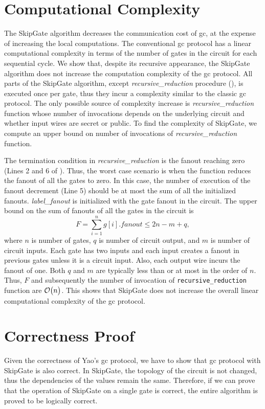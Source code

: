 \section{Computational Complexity}\label{sec:skipgate-complex}
The SkipGate algorithm decreases the communication cost of \acrshort{gc}, at the expense of increasing the local computations.
The conventional \acrshort{gc} protocol has a linear computational complexity in terms of the number of gates in the circuit for each sequential cycle.
We show that, despite its recursive appearance, the SkipGate algorithm does not increase the computation complexity of the \acrshort{gc} protocol.
All parts of the SkipGate algorithm, except \textit{recursive\_reduction} procedure (), is executed once per gate, thus they incur a complexity similar to the classic \acrshort{gc} protocol.
The only possible source of complexity increase is \textit{recursive\_reduction} function whose number of invocations depends on the underlying circuit and whether input wires are secret or public.
To find the complexity of SkipGate, we compute an upper bound on number of invocations of \textit{recursive\_reduction} function.

The termination condition in \textit{recursive\_reduction} is the fanout reaching zero (Lines 2 and 6 of ).
Thus, the worst case scenario is when the function reduces the fanout of all the gates to zero.
In this case, the number of execution of the fanout decrement (Line 5) should be at most the sum of all the initialized fanouts.
\textit{label\_fanout} is initialized with the gate fanout in the circuit.
The upper bound on the sum of fanouts of all the gates in the circuit is $$F = \sum_{i=1}^{n} g[i].fanout \le 2n - m + q,$$ where $n$ is number of gates, $q$ is number of circuit output, and $m$ is number of circuit inputs.
Each gate has two inputs and each input creates a fanout in previous gates unless it is a circuit input.
Also, each output wire incurs the fanout of one.
Both $q$ and $m$ are typically less than or at most in the order of $n$.
Thus, $F$ and subsequently the number of invocation of \texttt{recursive\_reduction} function are $\mathcal{O}\bigl(n\bigr)$.
This shows that SkipGate does not increase the overall linear computational complexity of the \acrshort{gc} protocol.

\section{Correctness Proof}\label{sec:skipgate-correct}
Given the correctness of Yao's \acrshort{gc} protocol, we have to show that \acrshort{gc} protocol with SkipGate is also correct.
In SkipGate, the topology of the circuit is not changed, thus the dependencies of the values remain the same.
Therefore, if we can prove that the operation of SkipGate on a single gate is correct, the entire algorithm is proved to be logically correct.

